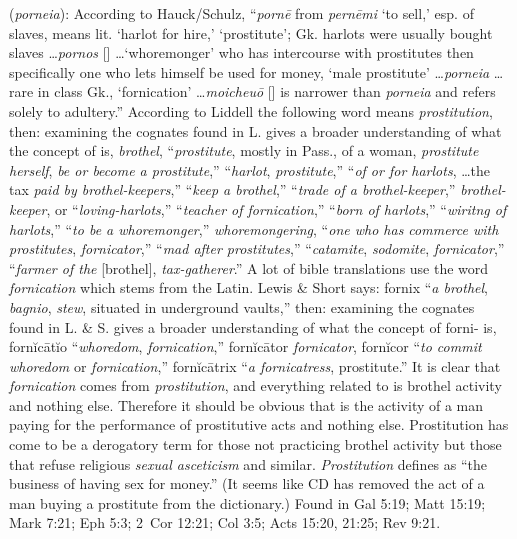 \item[Prostitution,]

(\textit{porneia}):
According to Hauck/Schulz, ``\emph{pornē} from \emph{pernēmi} `to sell,' esp. of slaves, means lit. `harlot for hire,' `prostitute'; Gk. harlots were usually bought slaves \ldots \emph{pornos} [] \ldots `whoremonger' who has intercourse with prostitutes then specifically one who lets himself be used for money, `male prostitute' \ldots \emph{porneia} \ldots rare in class Gk., `fornication' \ldots \emph{moicheuō} [] is narrower than \emph{porneia} and refers solely to adultery.''
According to Liddell the following word  means \emph{prostitution}, 
then: examining the cognates found in L. gives a broader understanding of what the concept of  is,
 \emph{brothel}, 
 ``\emph{prostitute}, mostly in Pass., of a woman, \emph{prostitute herself}, \emph{be or become a prostitute},'' 
 ``\emph{harlot}, \emph{prostitute},'' 
 ``\emph{of or for harlots}, \ldots the tax \emph{paid by brothel-keepers},'' 
 ``\emph{keep a brothel},'' 
 ``\emph{trade of a brothel-keeper},'' 
 \emph{brothel-keeper}, 
 or  ``\emph{loving-harlots},'' 
 ``\emph{teacher of fornication},'' 
 ``\emph{born of harlots},'' 
 ``\emph{wiritng of harlots},'' 
 ``\emph{to be a whoremonger},'' 
 \emph{whoremongering}, 
 ``\emph{one who has commerce with prostitutes}, \emph{fornicator},'' 
 ``\emph{mad after prostitutes},'' 
 ``\emph{catamite}, \emph{sodomite}, \emph{fornicator},'' 
 ``\emph{farmer of the} [brothel], \emph{tax-gatherer}.'' 
A lot of bible translations use the word \emph{fornication} which stems from the Latin. Lewis \& Short says: fornix ``\emph{a brothel},  \emph{bagnio}, \emph{stew}, situated in underground vaults,''
then: examining the cognates found in L. \& S. gives a broader understanding of what the concept of forni- is,
fornĭcātĭo ``\emph{whoredom}, \emph{fornication},'' 
fornĭcātor \emph{fornicator}, 
fornĭcor ``\emph{to commit whoredom} or \emph{fornication},'' 
fornĭcātrix ``\emph{a fornicatress}, prostitute.'' 
It is clear that \emph{fornication} comes from \emph{prostitution}, and everything related to  is brothel activity and nothing else. Therefore it should be obvious that  is the activity of a man paying for the performance of prostitutive acts and nothing else. Prostitution has come to be a derogatory term for those not practicing brothel activity but those that refuse religious \emph{sexual asceticism} and similar. \emph{Prostitution} defines as ``the business of having sex for money.'' (It seems like CD has removed the act of a man buying a prostitute from the dictionary.)
Found in Gal 5:19; Matt 15:19; Mark 7:21; Eph 5:3; 2~Cor 12:21; Col 3:5; Acts 15:20, 21:25; Rev 9:21.
